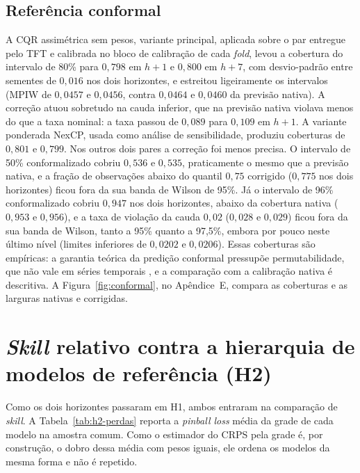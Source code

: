 \subsection{Referência conformal}
A CQR assimétrica sem pesos, variante principal, aplicada sobre o par entregue pelo TFT e calibrada no bloco de calibração de cada \textit{fold}, levou a cobertura do intervalo de 80\% para \(0{,}798\) em \(h+1\) e \(0{,}800\) em \(h+7\), com desvio-padrão entre sementes de \(0{,}016\) nos dois horizontes, e estreitou ligeiramente os intervalos (MPIW de \(0{,}0457\) e \(0{,}0456\), contra \(0{,}0464\) e \(0{,}0460\) da previsão nativa). A correção atuou sobretudo na cauda inferior, que na previsão nativa violava menos do que a taxa nominal: a taxa passou de \(0{,}089\) para \(0{,}109\) em \(h+1\). A variante ponderada NexCP, usada como análise de sensibilidade, produziu coberturas de \(0{,}801\) e \(0{,}799\). Nos outros dois pares a correção foi menos precisa. O intervalo de 50\% conformalizado cobriu \(0{,}536\) e \(0{,}535\), praticamente o mesmo que a previsão nativa, e a fração de observações abaixo do quantil \(0{,}75\) corrigido (\(0{,}775\) nos dois horizontes) ficou fora da sua banda de Wilson de 95\%. Já o intervalo de 96\% conformalizado cobriu \(0{,}947\) nos dois horizontes, abaixo da cobertura nativa (\(0{,}953\) e \(0{,}956\)), e a taxa de violação da cauda \(0{,}02\) (\(0{,}028\) e \(0{,}029\)) ficou fora da sua banda de Wilson, tanto a 95\% quanto a 97,5\%, embora por pouco neste último nível (limites inferiores de \(0{,}0202\) e \(0{,}0206\)). Essas coberturas são empíricas: a garantia teórica da predição conformal pressupõe permutabilidade, que não vale em séries temporais \cite{BARBER2023}, e a comparação com a calibração nativa é descritiva. A Figura~\ref{fig:conformal}, no Apêndice~E, compara as coberturas e as larguras nativas e corrigidas.

\section{\textit{Skill} relativo contra a hierarquia de modelos de referência (H2)} \label{sec:h2}
Como os dois horizontes passaram em H1, ambos entraram na comparação de \textit{skill}. A Tabela~\ref{tab:h2-perdas} reporta a \textit{pinball loss} média da grade de cada modelo na amostra comum. Como o estimador do CRPS pela grade é, por construção, o dobro dessa média com pesos iguais, ele ordena os modelos da mesma forma e não é repetido.

